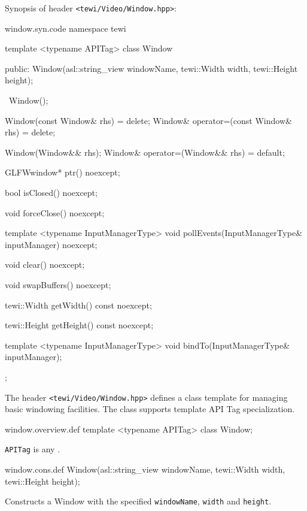 
Synopsis of header \texttt{<tewi/Video/Window.hpp>}:

\begin{tewicode}{window.syn.code}
namespace tewi
{
    template <typename APITag>
    class Window
    {
    public:
        Window(asl::string_view windowName, tewi::Width width, tewi::Height height);

        ~Window();

        Window(const Window& rhs) = delete;
        Window& operator=(const Window& rhs) = delete;

        Window(Window&& rhs);
        Window& operator=(Window&& rhs) = default;

        GLFWwindow* ptr() noexcept;

        bool isClosed() noexcept;

        void forceClose() noexcept;

        template <typename InputManagerType>
        void pollEvents(InputManagerType& inputManager) noexcept;

        void clear() noexcept;

        void swapBuffers() noexcept;

        tewi::Width getWidth() const noexcept;

        tewi::Height getHeight() const noexcept;

        template <typename InputManagerType>
        void bindTo(InputManagerType& inputManager);
    };
}
\end{tewicode}


The header \texttt{<tewi/Video/Window.hpp>} defines a class template for
managing basic windowing facilities. The class supports template API Tag
specialization.

\begin{tewicode}{window.overview.def}
template <typename APITag>
class Window;
\end{tewicode}

\begin{itemdescr}
\pnum
\tparam
\texttt{APITag} is any .
\end{itemdescr}



\begin{tewicode}{window.cons.def}
Window(asl::string_view windowName, tewi::Width width, tewi::Height height);
\end{tewicode}
\begin{itemdescr}
\pnum
\effects
Constructs a Window with the specified \texttt{windowName}, \texttt{width} and \texttt{height}.
\end{itemdescr}

